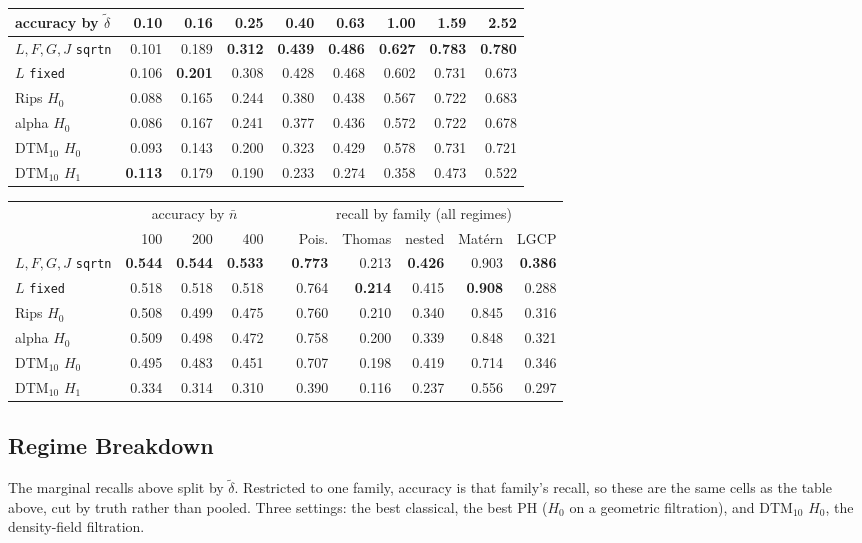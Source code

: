 \documentclass[11pt]{article}
\newcommand{\dt}{\tilde\delta}
\newcommand{\nb}{\bar n}
\begin{document}
\smallskip
\begin{tabular}{@{}lrrrrrrrr@{}}
\toprule
accuracy by $\dt$ & 0.10 & 0.16 & 0.25 & 0.40 & 0.63 & 1.00 & 1.59 & 2.52 \\
\midrule
$L,F,G,J$ \texttt{sqrtn} & 0.101 & 0.189 & \textbf{0.312} & \textbf{0.439} & \textbf{0.486} & \textbf{0.627} & \textbf{0.783} & \textbf{0.780} \\
$L$ \texttt{fixed}       & 0.106 & \textbf{0.201} & 0.308 & 0.428 & 0.468 & 0.602 & 0.731 & 0.673 \\
Rips $H_0$               & 0.088 & 0.165 & 0.244 & 0.380 & 0.438 & 0.567 & 0.722 & 0.683 \\
alpha $H_0$              & 0.086 & 0.167 & 0.241 & 0.377 & 0.436 & 0.572 & 0.722 & 0.678 \\
DTM$_{10}$ $H_0$         & 0.093 & 0.143 & 0.200 & 0.323 & 0.429 & 0.578 & 0.731 & 0.721 \\
DTM$_{10}$ $H_1$         & \textbf{0.113} & 0.179 & 0.190 & 0.233 & 0.274 & 0.358 & 0.473 & 0.522 \\
\bottomrule
\end{tabular}

\medskip
\begin{tabular}{@{}lrrrcrrrrr@{}}
\toprule
 & \multicolumn{3}{c}{accuracy by $\nb$} & & \multicolumn{5}{c}{recall by family (all regimes)} \\
\cmidrule(r){2-4}\cmidrule(l){6-10}
 & 100 & 200 & 400 & & Pois. & Thomas & nested & Mat\'ern & LGCP \\
\midrule
$L,F,G,J$ \texttt{sqrtn} & \textbf{0.544} & \textbf{0.544} & \textbf{0.533} & & \textbf{0.773} & 0.213 & \textbf{0.426} & 0.903 & \textbf{0.386} \\
$L$ \texttt{fixed}       & 0.518 & 0.518 & 0.518 & & 0.764 & \textbf{0.214} & 0.415 & \textbf{0.908} & 0.288 \\
Rips $H_0$               & 0.508 & 0.499 & 0.475 & & 0.760 & 0.210 & 0.340 & 0.845 & 0.316 \\
alpha $H_0$              & 0.509 & 0.498 & 0.472 & & 0.758 & 0.200 & 0.339 & 0.848 & 0.321 \\
DTM$_{10}$ $H_0$         & 0.495 & 0.483 & 0.451 & & 0.707 & 0.198 & 0.419 & 0.714 & 0.346 \\
DTM$_{10}$ $H_1$         & 0.334 & 0.314 & 0.310 & & 0.390 & 0.116 & 0.237 & 0.556 & 0.297 \\
\bottomrule
\end{tabular}

\subsection*{Regime Breakdown}
The marginal recalls above split by $\dt$. Restricted to one family, accuracy is that family's recall, so these are the same cells as the table above, cut by truth rather than pooled. Three settings: the best classical, the best PH ($H_0$ on a geometric filtration), and DTM$_{10}$ $H_0$, the density-field filtration.
\end{document}
